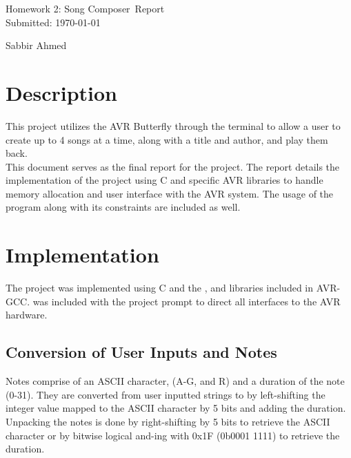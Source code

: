 \documentclass[usletter, 12pt]{article}
\newcommand{\project}{Homework 2: Song Composer}
\newcommand{\Sabbir}{Sabbir Ahmed}
\begin{document}
    \begin{titlepage}

        \vspace*{\fill} %
        \begin{center}

            {\LARGE \project~Report}\\ [1.5cm]

            Submitted: \today
            
            \vspace*{\fill}

            \Sabbir

        \end{center}
        \vspace*{\fill} %

    \end{titlepage}

    \section{Description}
    This project utilizes the AVR Butterfly through the terminal to allow a user to create up to 4 songs at a time, along with a title and author, and play them back. \\

    \noindent This document serves as the final report for the project. The report details the implementation of the project using C and specific AVR libraries to handle memory allocation and user interface with the AVR system. The usage of the program along with its constraints are included as well.

    \section{Implementation}
    The project was implemented using C and the ,  and  libraries included in AVR-GCC.  was included with the project prompt to direct all interfaces to the AVR hardware.

        \subsection{Conversion of User Inputs and Notes}
        Notes comprise of an ASCII character, (A-G, and R) and a duration of the note (0-31). They are converted from user inputted strings to  by left-shifting the integer value mapped to the ASCII character by 5 bits and adding the duration. \\
        Unpacking the notes is done by right-shifting by 5 bits to retrieve the ASCII character or by bitwise logical and-ing with 0x1F (0b0001 1111) to retrieve the duration.
\end{document}
